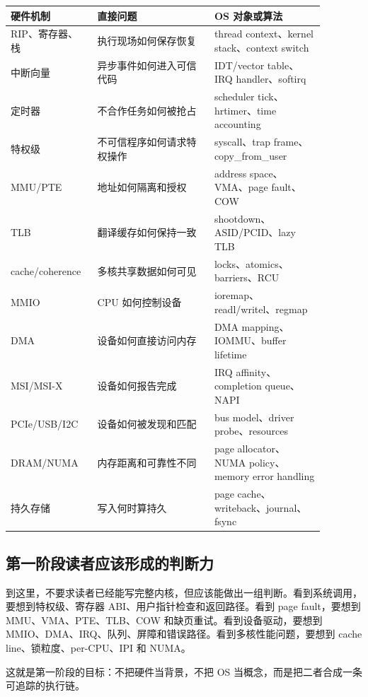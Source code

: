 \begin{longtable}{p{0.22\linewidth}p{0.34\linewidth}p{0.32\linewidth}}
\toprule
硬件机制 & 直接问题 & OS 对象或算法 \\
\midrule
RIP、寄存器、栈 & 执行现场如何保存恢复 & thread context、kernel stack、context switch \\
中断向量 & 异步事件如何进入可信代码 & IDT/vector table、IRQ handler、softirq \\
定时器 & 不合作任务如何被抢占 & scheduler tick、hrtimer、time accounting \\
特权级 & 不可信程序如何请求特权操作 & syscall、trap frame、copy\_from\_user \\
MMU/PTE & 地址如何隔离和授权 & address space、VMA、page fault、COW \\
TLB & 翻译缓存如何保持一致 & shootdown、ASID/PCID、lazy TLB \\
cache/coherence & 多核共享数据如何可见 & locks、atomics、barriers、RCU \\
MMIO & CPU 如何控制设备 & ioremap、readl/writel、regmap \\
DMA & 设备如何直接访问内存 & DMA mapping、IOMMU、buffer lifetime \\
MSI/MSI-X & 设备如何报告完成 & IRQ affinity、completion queue、NAPI \\
PCIe/USB/I2C & 设备如何被发现和匹配 & bus model、driver probe、resources \\
DRAM/NUMA & 内存距离和可靠性不同 & page allocator、NUMA policy、memory error handling \\
持久存储 & 写入何时算持久 & page cache、writeback、journal、fsync \\
\bottomrule
\end{longtable}

\subsection{第一阶段读者应该形成的判断力}

到这里，不要求读者已经能写完整内核，但应该能做出一组判断。看到系统调用，要想到特权级、寄存器 ABI、用户指针检查和返回路径。看到 page fault，要想到 MMU、VMA、PTE、TLB、COW 和缺页重试。看到设备驱动，要想到 MMIO、DMA、IRQ、队列、屏障和错误路径。看到多核性能问题，要想到 cache line、锁粒度、per-CPU、IPI 和 NUMA。

这就是第一阶段的目标：不把硬件当背景，不把 OS 当概念，而是把二者合成一条可追踪的执行链。
